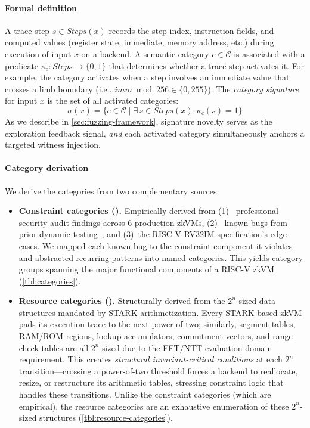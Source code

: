 \paragraph{Formal definition}
A trace step $s \in \mathit{Steps}(x)$ records the step index, instruction fields, and computed values (register state, immediate, memory address, etc.) during execution of input $x$ on a backend. A semantic category $c \in \mathcal{C}$ is associated with a predicate $\kappa_c : \mathit{Steps} \to \{0, 1\}$ that determines whether a trace step activates it. For example, the  category activates when a step involves an immediate value that crosses a limb boundary (i.e., $\mathit{imm} \bmod 256 \in \{0, 255\}$). The \emph{category signature} for input $x$ is the set of all activated categories:
\begin{equation}\label{eq:signature}
\sigma(x) = \bigl\{c \in \mathcal{C} \;\big|\; \exists\, s \in \mathit{Steps}(x) : \kappa_c(s) = 1\bigr\}
\end{equation}
As we describe in \autoref{sec:fuzzing-framework}, signature novelty serves as the exploration feedback signal, \emph{and} each activated category simultaneously anchors a targeted witness injection.

\paragraph{Category derivation}
We derive the  categories from two complementary sources:

\begin{itemize}
    \item \textbf{Constraint categories ().} Empirically derived from (1)~ professional security audit findings across 6 production zkVMs, (2)~ known bugs from prior dynamic testing~\cite{arguzz}, and (3)~the RISC-V RV32IM specification's edge cases. We mapped each known bug to the constraint component it violates and abstracted recurring patterns into named categories. This yields  category groups spanning the major functional components of a RISC-V zkVM (\autoref{tbl:categories}).

    \item \textbf{Resource categories ().} Structurally derived from the $2^n$-sized data structures mandated by STARK arithmetization. Every STARK-based zkVM pads its execution trace to the next power of two; similarly, segment tables, RAM/ROM regions, lookup accumulators, commitment vectors, and range-check tables are all $2^n$-sized due to the FFT/NTT evaluation domain requirement. This creates \emph{structural invariant-critical conditions} at each $2^n$ transition---crossing a power-of-two threshold forces a backend to reallocate, resize, or restructure its arithmetic tables, stressing constraint logic that handles these transitions. Unlike the constraint categories (which are empirical), the  resource categories are an exhaustive enumeration of these $2^n$-sized structures (\autoref{tbl:resource-categories}).
\end{itemize}

